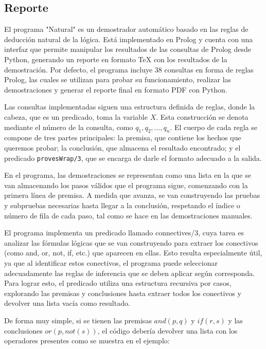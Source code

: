 \documentclass[11pt, letterpaper]{article}
\begin{document}
	\newpage
	
	\subsection{Reporte}
	
	El programa "Natural" es un demostrador automático basado en las reglas de deducción natural de la lógica. Está implementado en Prolog y cuenta con una interfaz que permite manipular los resultados de las consultas de Prolog desde Python, generando un reporte en formato TeX con los resultados de la demostración. Por defecto, el programa incluye 38 consultas en forma de reglas Prolog, las cuales se utilizan para probar su funcionamiento, realizar las demostraciones y generar el reporte final en formato PDF con Python.
	
	Las consultas implementadas siguen una estructura definida de reglas, donde la cabeza, que es un predicado, toma la variable $X$. Esta construcción se denota mediante el número de la consulta, como $q_1, q_2, \dots , q_n$. El cuerpo de cada regla se compone de tres partes principales: la premisa, que contiene los hechos que queremos probar; la conclusión, que almacena el resultado encontrado; y el predicado \texttt{provesWrap/3}, que se encarga de darle el formato adecuado a la salida.
	
	En el programa, las demostraciones se representan como una lista en la que se van almacenando los pasos válidos que el programa sigue, comenzando con la primera línea de premisa. A medida que avanza, se van construyendo las pruebas y subpruebas necesarias hasta llegar a la conclusión, respetando el índice o número de fila de cada paso, tal como se hace en las demostraciones manuales.	
	
	El programa implementa un predicado llamado connectives/3, cuya tarea es analizar las fórmulas lógicas que se van construyendo para extraer los conectivos (como and, or, not, if, etc.) que aparecen en ellas. Esto resulta especialmente útil, ya que al identificar estos conectivos, el programa puede seleccionar adecuadamente las reglas de inferencia que se deben aplicar según corresponda. Para lograr esto, el predicado utiliza una estructura recursiva por casos, explorando las premisas y conclusiones hasta extraer todos los conectivos y devolver una lista vacía como resultado.
	
	De forma muy simple, si se tienen las premisas $and(p, q)$ y $if(r,s)$ y las conclusiones $or(p,not(s))$, el código debería devolver una lista con los operadores presentes como se muestra en el ejemplo:
	
\end{document}
